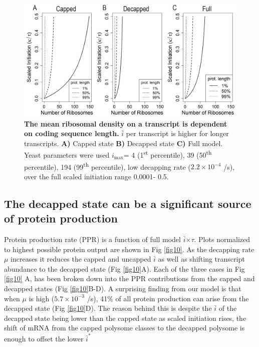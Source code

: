 \documentclass[10pt,letterpaper]{article}
\newcommand{\imax}{\ensuremath{{i_{\max}}}\xspace}
\newcommand{\MRL}{\ensuremath{\bar{i}}\xspace}
\begin{document}
\begin{figure}[!h]
  \begin{center}
    \includegraphics[width=120mm]{Images/MRL.png}
    \caption{{\bf The mean ribosomal density on a transcript is dependent on coding sequence length.} 
      \MRL per transcript is higher for longer transcripts. {\bf A)} Capped state {\bf B)} Decapped state {\bf C)} Full model.
      Yeast parameters were used \imax =  4 (1\textsuperscript{st} percentile),  39 (50\textsuperscript{th} percentile), 194 (99\textsuperscript{th} percentile), low decapping rate ($2.2\times 10^{-4}$ /s), over the full scaled initiation range 0.0001- 0.5.}
    \label{fig9}
  \end{center}
\end{figure}

\subsection*{The decapped state can be a significant source of protein production} 
Protein production rate (PPR) is a function of full model \MRL $\times \tau$.
Plots normalized to highest possible protein output are shown in Fig \ref{fig10}.
As the decapping rate $\mu$ increases it reduces the capped and uncapped \MRL as well as shifting transcript abundance to the decapped state (Fig \ref{fig10}A).
Each of the three cases in Fig \ref{fig10} A, has been broken down into the PPR contributions from the capped and decapped states (Fig \ref{fig10}B-D). 
A surprising finding from our model is that when $\mu$ is high ($5.7\times 10^{-3}$ /s), 41\% of all protein production can arise from the decapped state (Fig \ref{fig10}D).
The reason behind this is despite the \MRL of the decapped state being lower than the capped state as scaled initiation rises, the shift of mRNA from the capped polysome classes to the decapped polysome is enough to offset the lower $\MRL^*$
\end{document}
